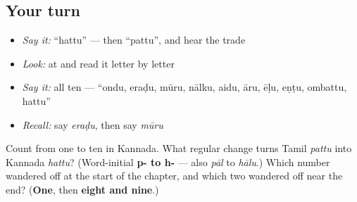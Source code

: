 \subsection*{Your turn}
\begin{itemize}
\raggedright
  \item \emph{Say it:} \textquotedblleft{}hattu\textquotedblright{} — then \textquotedblleft{}pattu\textquotedblright{}, and hear the trade
  \item \emph{Look:} at  and read it letter by letter
  \item \emph{Say it:} all ten — \textquotedblleft{}ondu, eraḍu, mūru, nālku, aidu, āru, ēḷu, eṇṭu, ombattu, hattu\textquotedblright{}
  \item \emph{Recall:} say \emph{eraḍu}, then say \emph{mūru}
\end{itemize}

\begin{tcolorbox}[breakable,colback=teal!4,colframe=teal!35!black,title={Before you move on}]
Count from one to ten in Kannada. What regular change turns Tamil \emph{pattu} into Kannada \emph{hattu}? (Word-initial \textbf{p- to h-} — also \emph{pāl} to \emph{hālu}.) Which number wandered off at the start of the chapter, and which two wandered off near the end? (\textbf{One}, then \textbf{eight and nine}.)
\end{tcolorbox}
